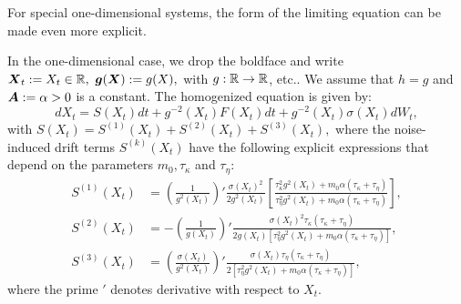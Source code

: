 For special one-dimensional systems, the form of the limiting equation can be made even more explicit. 
\begin{corollary} \label{1dcase}
In the one-dimensional case, we drop the boldface and write $\boldsymbol{X}_{t} := X_{t} \in \mathbb{R}, \ \boldsymbol{g}(\boldsymbol{X}) := g(X),$ with $g: \mathbb{R} \to \mathbb{R}$, etc.. We assume that $h = g$ and $\boldsymbol{A} := \alpha > 0$ is a constant. The homogenized equation is given by:
\begin{equation} \label{onedlimitSDE}
dX_{t} = S(X_{t}) dt + g^{-2}(X_{t}) F(X_{t}) dt + g^{-2}(X_{t}) \sigma(X_{t}) dW_{t},
\end{equation}
with $S(X_{t}) = S^{(1)}(X_{t}) + S^{(2)}(X_{t}) + S^{(3)}(X_{t}),$ where the noise-induced drift terms $S^{(k)}(X_{t})$ have the following explicit expressions that depend on the parameters $m_{0}, \tau_{\kappa}$ and $\tau_{\eta}$:
\begin{align} 
S^{(1)}(X_{t}) &= \left(\frac{1}{g^2(X_{t})} \right)'  \frac{  \sigma(X_{t})^2}{2 g^2(X_{t})} \left[\frac{\tau_{\kappa}^2 g^2(X_{t})+m_{0}\alpha (\tau_{\kappa}+\tau_{\eta})}{\tau_{\eta}^2 g^2(X_{t})+m_{0}\alpha (\tau_{\kappa}+\tau_{\eta})} \right], \label{86} \\ 
S^{(2)}(X_{t}) &=  - \left(\frac{1}{g(X_{t})} \right)'  \frac{ \sigma(X_{t})^2 \tau_{\kappa}(\tau_{\kappa}+\tau_{\eta})}{2g(X_{t})[\tau_{\eta}^2 g^2(X_{t})+m_{0}\alpha(\tau_{\kappa}+\tau_{\eta})]},  \label{87} \\
S^{(3)}(X_{t}) &= \left(\frac{\sigma(X_{t})}{g^2(X_{t})} \right)'  \frac{ \sigma(X_{t})\tau_{\eta} (\tau_{\kappa}+\tau_{\eta})}{2[\tau_{\eta}^2 g^2(X_{t})+m_{0}\alpha (\tau_{\kappa}+\tau_{\eta})]}, \label{88}  
\end{align}
where the prime $'$ denotes derivative with respect to $X_t$. 
\end{corollary}
